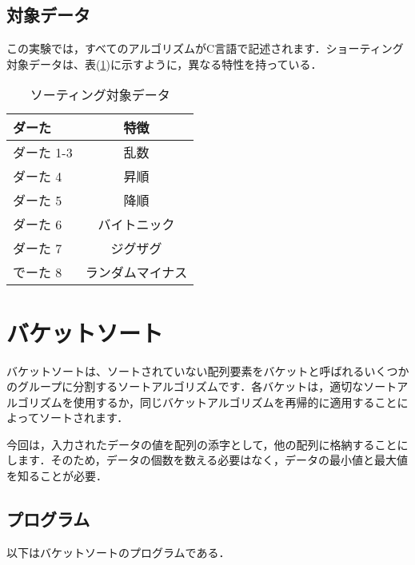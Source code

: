 \documentclass[a4j, titlepage]{jarticle}
\begin{document}
        \subsection{対象データ}
            この実験では，すべてのアルゴリズムがC言語で記述されます．ショーティング対象データは、表(\ref{tab:data})に示すように，異なる特性を持っている．
            \begin{table}[tbh]
                \caption{ソーティング対象データ}
                \label{tab:data}
                \begin{center}
                    \begin{tabular}{lc}
                        \hline
                        ダーた & 特徴 \\ \hline\hline
                        ダーた 1-3 & 乱数\\ 
                        ダーた 4 &  昇順\\ 
                        ダーた 5 &  降順\\ 
                        ダーた 6 &  バイトニック\\ 
                        ダーた 7 &  ジグザグ\\ 
                        でーた 8 & ランダムマイナス\\ \hline
                    \end{tabular}
                \end{center}
            \end{table}

    \section{バケットソート}
        バケットソートは、ソートされていない配列要素をバケットと呼ばれるいくつかのグループに分割するソートアルゴリズムです．各バケットは，適切なソートアルゴリズムを使用するか，同じバケットアルゴリズムを再帰的に適用することによってソートされます．

        今回は，入力されたデータの値を配列の添字として，他の配列に格納することにします．そのため，データの個数を数える必要はなく，データの最小値と最大値を知ることが必要．

        \subsection{プログラム}
            以下はバケットソートのプログラムである．
            
\end{document}
